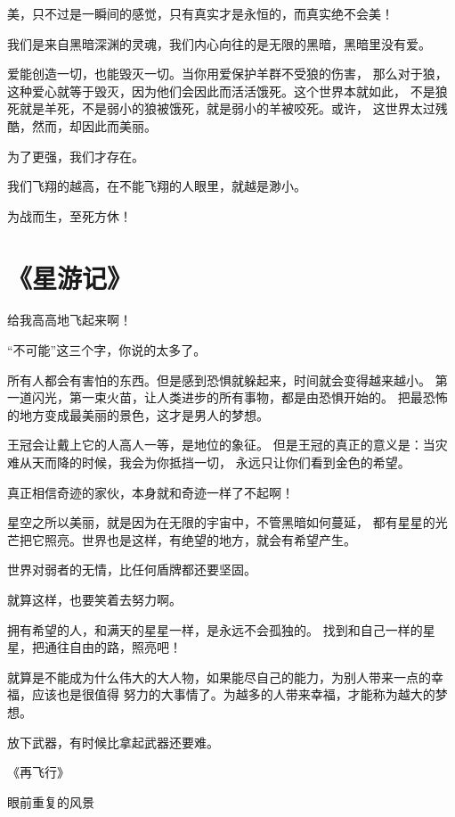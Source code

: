 \documentclass[UTF8,oneside]{ctexbook}
\begin{document}
\mfApache \quad 美，只不过是一瞬间的感觉，只有真实才是永恒的，而真实绝不会美！

\mfApache \quad 我们是来自黑暗深渊的灵魂，我们内心向往的是无限的黑暗，黑暗里没有爱。

\mfApache \quad 爱能创造一切，也能毁灭一切。当你用爱保护羊群不受狼的伤害，
那么对于狼，这种爱心就等于毁灭，因为他们会因此而活活饿死。这个世界本就如此，
不是狼死就是羊死，不是弱小的狼被饿死，就是弱小的羊被咬死。或许，
这世界太过残酷，然而，却因此而美丽。

\mfApache \quad 为了更强，我们才存在。

\mfApache \quad 我们飞翔的越高，在不能飞翔的人眼里，就越是渺小。

\mfApache \quad 为战而生，至死方休！
\section{《星游记》}
\mfApache \quad 给我高高地飞起来啊！

\mfApache \quad “不可能”这三个字，你说的太多了。

\mfApache \quad 所有人都会有害怕的东西。但是感到恐惧就躲起来，时间就会变得越来越小。
第一道闪光，第一束火苗，让人类进步的所有事物，都是由恐惧开始的。
把最恐怖的地方变成最美丽的景色，这才是男人的梦想。

\mfApache \quad 王冠会让戴上它的人高人一等，是地位的象征。
但是王冠的真正的意义是：当灾难从天而降的时候，我会为你抵挡一切，
永远只让你们看到金色的希望。

\mfApache \quad 真正相信奇迹的家伙，本身就和奇迹一样了不起啊！

\mfApache \quad 星空之所以美丽，就是因为在无限的宇宙中，不管黑暗如何蔓延，
都有星星的光芒把它照亮。世界也是这样，有绝望的地方，就会有希望产生。

\mfApache \quad 世界对弱者的无情，比任何盾牌都还要坚固。

\mfApache \quad 就算这样，也要笑着去努力啊。

\mfApache \quad 拥有希望的人，和满天的星星一样，是永远不会孤独的。
找到和自己一样的星星，把通往自由的路，照亮吧！

\mfApache \quad 就算是不能成为什么伟大的大人物，如果能尽自己的能力，为别人带来一点的幸福，应该也是很值得
努力的大事情了。为越多的人带来幸福，才能称为越大的梦想。

\mfApache \quad 放下武器，有时候比拿起武器还要难。

\mfApache \quad \quad \quad \quad \quad 《再飞行》

\quad \quad \quad \quad \quad 眼前重复的风景
\end{document}
